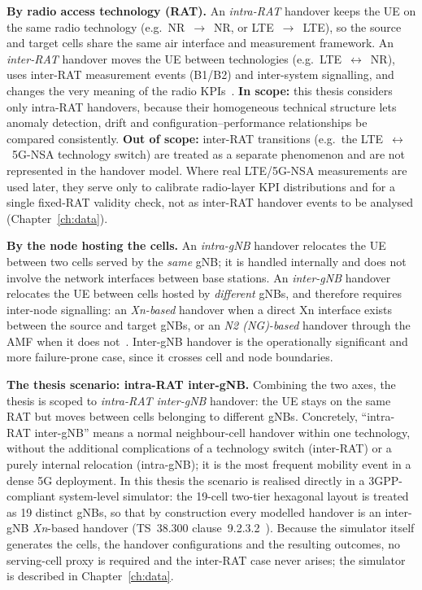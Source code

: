 \textbf{By radio access technology (RAT).}
An \emph{intra-RAT} handover keeps the UE on the same radio technology (e.g.\
NR~$\rightarrow$~NR, or LTE~$\rightarrow$~LTE), so the source and target cells
share the same air interface and measurement framework. An \emph{inter-RAT}
handover moves the UE between technologies (e.g.\ LTE~$\leftrightarrow$~NR), uses
inter-RAT measurement events (B1/B2) and inter-system signalling, and changes
the very meaning of the radio KPIs~\cite{ts38300,ts37340}. \textbf{In scope:}
this thesis considers only intra-RAT handovers, because their homogeneous
technical structure lets anomaly detection, drift and
configuration--performance relationships be compared consistently.
\textbf{Out of scope:} inter-RAT transitions (e.g.\ the
LTE~$\leftrightarrow$~5G-NSA technology switch) are treated as a separate
phenomenon and are not represented in the handover model. Where real LTE/5G-NSA
measurements are used later, they serve only to calibrate radio-layer KPI
distributions and for a single fixed-RAT validity check, not as inter-RAT
handover events to be analysed (Chapter~\ref{ch:data}).

\textbf{By the node hosting the cells.}
An \emph{intra-gNB} handover relocates the UE between two cells served by the
\emph{same} gNB; it is handled internally and does not involve the network
interfaces between base stations. An \emph{inter-gNB} handover relocates the UE
between cells hosted by \emph{different} gNBs, and therefore requires
inter-node signalling: an \emph{Xn-based} handover when a direct Xn interface
exists between the source and target gNBs, or an \emph{N2 (NG)-based} handover
through the AMF when it does not~\cite{ts38300}. Inter-gNB handover is the
operationally significant and more failure-prone case, since it crosses cell and
node boundaries.

\textbf{The thesis scenario: intra-RAT inter-gNB.}
Combining the two axes, the thesis is scoped to \emph{intra-RAT inter-gNB}
handover: the UE stays on the same RAT but moves between cells belonging to
different gNBs. Concretely, ``intra-RAT inter-gNB'' means a normal neighbour-cell handover
within one technology, without the additional complications of a technology
switch (inter-RAT) or a purely internal relocation (intra-gNB); it is the most
frequent mobility event in a dense 5G deployment. In this thesis
the scenario is realised directly in a 3GPP-compliant system-level simulator: the
19-cell two-tier hexagonal layout is treated as 19 distinct gNBs, so that by
construction every modelled handover is an inter-gNB \emph{Xn}-based handover
(TS~38.300 clause~9.2.3.2~\cite{ts38300}). Because the simulator itself generates
the cells, the handover configurations and the resulting outcomes, no
serving-cell proxy is required and the inter-RAT case never arises; the simulator
is described in Chapter~\ref{ch:data}.


